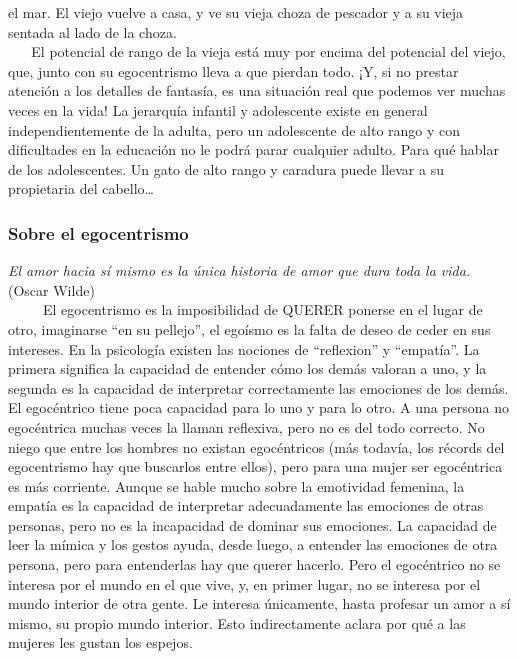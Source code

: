 el mar. El viejo vuelve a casa, y ve su vieja choza de pescador y a su
vieja sentada al lado de la choza.\\
\hspace*{0.333em} ~ ~ El potencial de rango de la vieja está muy por
encima del potencial del viejo, que, junto con su egocentrismo lleva a
que pierdan todo. ¡Y, si no prestar atención a los detalles de fantasía,
es una situación real que podemos ver muchas veces en la vida! La
jerarquía infantil y adolescente existe en general independientemente de
la adulta, pero un adolescente de alto rango y con dificultades en la
educación no le podrá parar cualquier adulto. Para qué hablar de los
adolescentes. Un gato de alto rango y caradura puede llevar a su
propietaria del cabello\ldots{}

\protect\hypertarget{M22}{}{}

\hypertarget{sobre-el-egocentrismo}{\subsubsection{Sobre el egocentrismo}
\label{sobre-el-egocentrismo}}

\noindent
\textit{El amor hacia sí mismo es la única historia de amor que dura toda la vida.}\\
(Oscar Wilde)\\



~ ~ ~ El egocentrismo es la imposibilidad de QUERER ponerse en el lugar
de otro, imaginarse ``en su pellejo'', el egoísmo es la falta de deseo
de ceder en sus intereses. En la psicología existen las nociones de
``reflexion'' y ``empatía''. La primera significa la capacidad de
entender cómo los demás valoran a uno, y la segunda es la capacidad de
interpretar correctamente las emociones de los demás. El egocéntrico
tiene poca capacidad para lo uno y para lo otro. A una persona no
egocéntrica muchas veces la llaman reflexiva, pero no es del todo
correcto. No niego que entre los hombres no existan egocéntricos (más
todavía, los récords del egocentrismo hay que buscarlos entre ellos),
pero para una mujer ser egocéntrica es más corriente. Aunque se hable
mucho sobre la emotividad femenina, la empatía es la capacidad de
interpretar adecuadamente las emociones de otras personas, pero no es la
incapacidad de dominar sus emociones. La capacidad de leer la mímica y
los gestos ayuda, desde luego, a entender las emociones de otra persona,
pero para entenderlas hay que querer hacerlo. Pero el egocéntrico no se
interesa por el mundo en el que vive, y, en primer lugar, no se interesa
por el mundo interior de otra gente. Le interesa únicamente, hasta
profesar un amor a sí mismo, su propio mundo interior. Esto
indirectamente aclara por qué a las mujeres les gustan los espejos.

